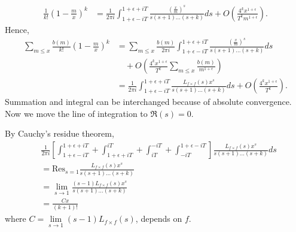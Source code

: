 \documentclass[sn-mathphys,Numbered]{sn-jnl}
\theoremstyle{thmstyleone}%
\theoremstyle{thmstyletwo}%
\theoremstyle{thmstylethree}%
\begin{document}
\begin{align*}
\frac{1}{k!} \left( 1-\frac{m}{x} \right)^k &= \frac{1}{2 \pi i} \int_{1+\epsilon-iT}^{1+\epsilon+iT} \frac{ \left( \frac{x}{m} \right)^s}{s(s+1)\dots(s+k)} ds + O \left( \frac{4^k x^{1+\epsilon}}{T^k m^{1+\epsilon}} \right). 
\end{align*}
Hence,
\begin{align*}
\sum_{m \leq x} \frac{b(m)}{k!} \left( 1-\frac{m}{x} \right)^k &= \sum_{m \leq x} \frac{b(m)}{2 \pi i} \int_{1+\epsilon-iT}^{1+\epsilon+iT} \frac{ \left( \frac{x}{m} \right)^s}{s(s+1)\dots(s+k)} ds \\
&\quad+ O \left( \frac{4^k x^{1+\epsilon}}{T^k} \sum_{m \leq x} \frac{b(m)}{m^{1+\epsilon}} \right) \\
&= \frac{1}{2 \pi i} \int_{1+\epsilon-iT}^{1+\epsilon+iT} \frac{L_{f \times f}(s) x^s}{s(s+1)\dots(s+k)} ds + O \left( \frac{4^k x^{1+\epsilon}}{T^k} \right).
\end{align*}
Summation and integral can be interchanged because of absolute convergence. Now we move the line of integration to $\Re(s)=0$. 

\begin{figure}[h!]
\begin{center}
\end{center}
\end{figure}

\noindent
By Cauchy's residue theorem,
\begin{align*}
&\frac{1}{2 \pi i} \left[ \int_{1+\epsilon-iT}^{1+\epsilon+iT} + \int_{1+\epsilon+iT}^{iT} + \int_{iT}^{-iT} + \int_{-iT}^{1+\epsilon-iT} \right] \frac{L_{f \times f}(s)x^s}{s(s+1)\dots (s+k)} ds \\
&= \text{Res}_{s=1} \frac{L_{f \times f}(s) x^s}{s(s+1)\dots (s+k)} \\
&= \lim_{s \to 1} \frac{(s-1)L_{f \times f}(s)x^s}{s(s+1)\dots (s+k)} \\
&= \frac{Cx}{(k+1)!}
\end{align*}
where $C=\lim \limits_{s \to 1}  (s-1) L_{f \times f}(s)$, depends on $f$. \\
\end{document}
